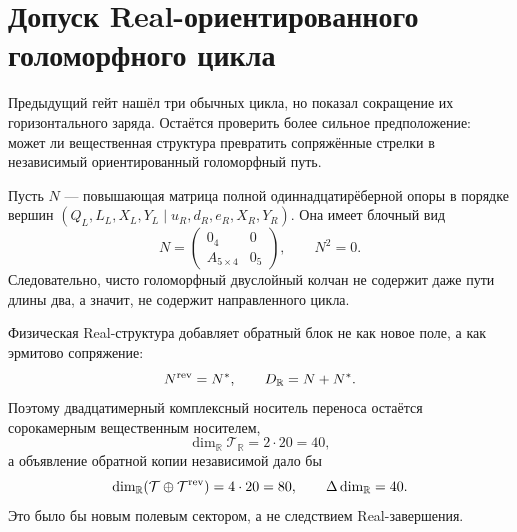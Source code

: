 \chapter{Допуск Real-ориентированного голоморфного цикла}
\label{ch:v8-horizontal-phase-real-oriented-cycle-admission-gate}

Предыдущий гейт нашёл три обычных цикла, но показал сокращение их
горизонтального заряда. Остаётся проверить более сильное предположение:
может ли вещественная структура превратить сопряжённые стрелки в независимый
ориентированный голоморфный путь.

Пусть $N$ --- повышающая матрица полной одиннадцатирёберной опоры в порядке
вершин $(Q_L,L_L,X_L,Y_L\mid u_R,d_R,e_R,X_R,Y_R)$. Она имеет блочный вид
\begin{equation}
 N=\begin{pmatrix}0_{4}&0\\A_{5\times4}&0_{5}\end{pmatrix},
 \qquad N^2=0.
 \label{eq:v8-real-oriented-raising-nilpotence}
\end{equation}
Следовательно, чисто голоморфный двуслойный колчан не содержит даже пути
длины два, а значит, не содержит направленного цикла.

Физическая Real-структура добавляет обратный блок не как новое поле, а как
эрмитово сопряжение:
\begin{equation}
 N^{\rm rev}=N^*,
 \qquad
 D_{\mathbb R}=N+N^*.
 \label{eq:v8-real-oriented-real-completion}
\end{equation}
Поэтому двадцатимерный комплексный носитель переноса остаётся
сорокамерным вещественным носителем,
\begin{equation}
 \dim_{\mathbb R}\mathcal T_{\mathbb R}=2\cdot20=40,
 \label{eq:v8-real-oriented-physical-dimension}
\end{equation}
а объявление обратной копии независимой дало бы
\begin{equation}
 \dim_{\mathbb R}(\mathcal T\oplus\mathcal T^{\rm rev})=4\cdot20=80,
 \qquad \Delta\dim_{\mathbb R}=40.
 \label{eq:v8-real-oriented-independent-reverse-dimension}
\end{equation}
Это было бы новым полевым сектором, а не следствием Real-завершения.

